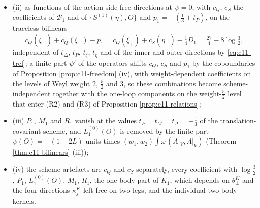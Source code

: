 \begin{corollary}
\begin{itemize}
\item (ii) as functions of the action-side free directions at $\psi=0$, with $c_Q$, $c_S$ the coefficients of $\mathcal B_1$ and of $\{S^{(1)}(\eta),O\}$ and $p_1=-(\tfrac13+t_P)$, on the traceless bilinears
\[
c_Q(\xi_+)+c_Q(\xi_-)-p_1=c_Q(\xi_+)+c_S(\eta_+)-\tfrac14D_1=\tfrac{27}4-8\log\tfrac32,
\]
independent of $t_\Delta$, $t_P$, $t_\xi$, $t_\eta$ and of the inner and outer directions by \eqref{eq:c11-trel}; a finite part $\psi'$ of the operators shifts $c_Q$, $c_S$ and $p_1$ by the coboundaries of Proposition \ref{prop:c11-freedom} (iv), with weight-dependent coefficients on the levels of Weyl weight $2$, $\tfrac52$ and $3$, so these combinations become scheme-independent together with the one-loop components on the weight-$\tfrac52$ level that enter (R2) and (R3) of Proposition \ref{prop:c11-relations};
\item (iii) $P_1$, $M_1$ and $R_1$ vanish at the values $t_P=t_M=t_\Delta=-\tfrac13$ of the translation-covariant scheme, and $L_1^{(0)}(O)$ is removed by the finite part $\psi(O)=-(1+2L)$ units times $(w_1,w_2)\int\omega\,(A|_V,A|_V)$ (Theorem \ref{thm:c11-bilinears} (iii));
\item (iv) the scheme artefacts are $c_Q$ and $c_S$ separately, every coefficient with $\log\tfrac32$, $P_1$, $L_1^{(0)}(O)$, $M_1$, $R_1$, the one-body part of $K_1$, which depends on $\theta^K_\perp$ and the four directions $\kappa^K_j$ left free on two legs, and the individual two-body kernels.
\end{itemize}
\end{corollary}

